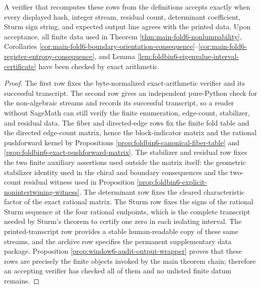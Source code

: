 \begin{proposition}
\begin{enumerate}[label=\textup{(\alph*)}]
\end{enumerate}
A verifier that recomputes these rows from the definitions accepts exactly when every displayed hash, integer stream, residual count, determinant coefficient, Sturm sign string, and expected output line agrees with the printed data.  Upon acceptance, all finite data used in Theorem \ref{thm:main-fold6-nonlumpability}, Corollaries \ref{cor:main-fold6-boundary-orientation-consequence}--\ref{cor:main-fold6-register-entropy-consequence}, and Lemma \ref{lem:foldbin6-eigenvalue-interval-certificate} have been checked by exact arithmetic.
\end{proposition}

\begin{proof}
The first row fixes the byte-normalized exact-arithmetic verifier and its successful transcript.  The second row gives an independent pure-Python check for the non-algebraic streams and records its successful transcript, so a reader without SageMath can still verify the finite enumeration, edge-count, stabilizer, and residual data.  The fiber and directed-edge rows fix the finite fold table and the directed edge-count matrix, hence the block-indicator matrix and the rational pushforward kernel by Propositions \ref{prop:foldbin6-canonical-fiber-table} and \ref{prop:foldbin6-exact-pushforward-matrix}.  The stabilizer and residual row fixes the two finite auxiliary assertions used outside the matrix itself: the geometric stabilizer identity used in the chiral and boundary consequences and the two-count residual witness used in Proposition \ref{prop:foldbin6-explicit-nonintertwining-witness}.  The determinant row fixes the cleared characteristic factor of the exact rational matrix.  The Sturm row fixes the signs of the rational Sturm sequence at the four rational endpoints, which is the complete transcript needed by Sturm's theorem to certify one zero in each isolating interval.  The printed-transcript row provides a stable human-readable copy of these same streams, and the archive row specifies the permanent supplementary data package.  Proposition \ref{prop:window6-audit-output-wrapper} proves that these rows are precisely the finite objects invoked by the main theorem chain; therefore an accepting verifier has checked all of them and no unlisted finite datum remains. \qedhere
\end{proof}

